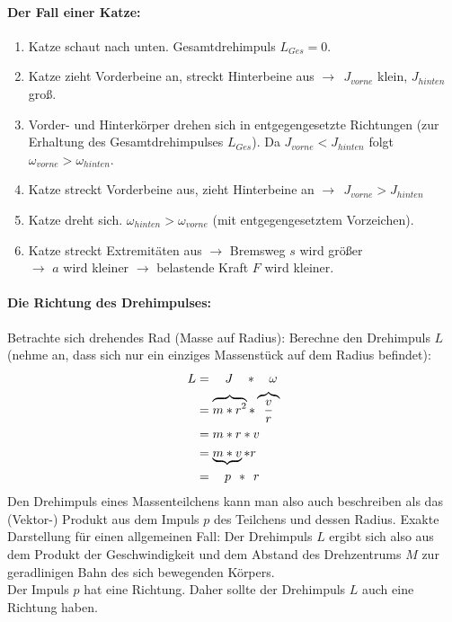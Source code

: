 \documentclass[12pt]{article}
\numberwithin{equation}{subsection}
\begin{document}
	\paragraph{Der Fall einer Katze:}
	\begin{enumerate}
		\item Katze schaut nach unten. Gesamtdrehimpuls $ L_{Ges} = 0 $.
		\item Katze zieht Vorderbeine an, streckt Hinterbeine aus $ \to \ \ J_{vorne} $ klein, $ J_{hinten} $ groß.
		\item Vorder- und Hinterkörper drehen sich in entgegengesetzte Richtungen (zur Erhaltung des Gesamtdrehimpulses $ L_{Ges} $). Da $ J_{vorne} < J_{hinten} $ folgt $ \omega_{vorne} > \omega_{hinten} $.
		\item Katze streckt Vorderbeine aus, zieht Hinterbeine an $ \to \ \ J_{vorne} > J_{hinten} $
		\item Katze dreht sich. $ \omega_{hinten} > \omega_{vorne} $ (mit entgegengesetztem Vorzeichen).
		\item Katze streckt Extremitäten aus $ \to $ Bremsweg $ s $ wird größer\\
		$ \to $ $ a $ wird kleiner $ \to $ belastende Kraft $ F $ wird kleiner.
	\end{enumerate}
	\paragraph{Die Richtung des Drehimpulses:}
	Betrachte sich drehendes Rad (Masse auf Radius):
	Berechne den Drehimpuls $ L $ (nehme an, dass sich nur ein einziges Massenstück auf dem Radius befindet):
	\begin{align}
		L &= \quad J\hspace{0.34cm}*\hspace{0.34cm}\omega\\
		&= \overbrace{m*r^2}*\overbrace{\dfrac{v}{r}}\\
		&= m*r*v\\
		&= \underbrace{m*v}*r\\
		&= \hspace{0.34cm}p\hspace{0.15cm}*\hspace{0.15cm}r
	\end{align}
	Den Drehimpuls eines Massenteilchens kann man also auch beschreiben als das (Vektor-) Produkt aus dem Impuls $ p $ des Teilchens und dessen Radius. Exakte Darstellung für einen allgemeinen Fall:
	Der Drehimpuls $ L $ ergibt sich also aus dem Produkt der Geschwindigkeit und dem Abstand des Drehzentrums $ M $ zur geradlinigen Bahn des sich bewegenden Körpers.\\
	Der Impuls $ p $ hat eine Richtung. Daher sollte der Drehimpuls $ L $ auch eine Richtung haben.
\end{document}
